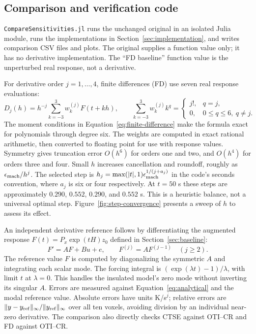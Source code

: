 \documentclass[10pt]{article}
\begin{document}
\subsection{Comparison and verification code}
\label{sec:verification}
\texttt{CompareSensitivities.jl} runs the unchanged original in an isolated Julia
module, runs the implementations in Section~\ref{sec:implementation}, and writes comparison CSV files and plots.
The original supplies a function value only; it has no derivative implementation.
The ``FD baseline'' function value is the unperturbed real response, not a derivative.

For derivative order $j=1,\ldots,4$, finite differences (FD) use seven real
response evaluations:
\begin{equation}
\label{eq:finite-difference}
 D_j(h)=h^{-j}\sum_{k=-3}^{3}w_k^{(j)}F(t+kh),\qquad
 \sum_{k=-3}^{3}w_k^{(j)}k^q=
 \begin{cases}j!,&q=j,\\0,&0\leq q\leq6,\ q\ne j.\end{cases}
\end{equation}
The moment conditions in Equation~\eqref{eq:finite-difference} make the formula exact for polynomials through degree six.
The weights are computed in exact rational arithmetic, then converted to floating
point for use with response values. Symmetry gives truncation error $O(h^6)$
for orders one and two, and $O(h^4)$ for orders three and four.
Small $h$ increases cancellation and roundoff, roughly as
$\epsilon_{\rm mach}/h^j$. The selected step is
$h_j=\max(|t|,1)\epsilon_{\rm mach}^{1/(j+a_j)}$ in the code's seconds convention,
where $a_j$ is six or four respectively. At $t=50$ s these steps are approximately
$0.290$, $0.552$, $0.290$, and $0.552$ s. This is a heuristic balance, not a
universal optimal step. Figure~\ref{fig:step-convergence} presents a sweep of $h$ to assess its effect.

An independent derivative reference follows by differentiating the augmented
response $F(t)=P_x\exp(tH)z_0$ defined in Section~\ref{sec:baseline}:
\begin{equation}
\label{eq:analytical}
 F'=AF+Bu+e,\qquad F^{(j)}=AF^{(j-1)}\quad(j\geq2).
\end{equation}
The reference value $F$ is computed by diagonalizing the symmetric $A$ and
integrating each scalar mode. The forcing integral is
$(\exp(\lambda t)-1)/\lambda$, with limit $t$ at $\lambda=0$.
This handles the insulated model's zero mode without inverting its singular $A$.
Errors are measured against Equation~\eqref{eq:analytical} and the modal reference
value. Absolute errors have units K/s$^j$; relative errors are
$\|y-y_{\rm ref}\|_\infty/\|y_{\rm ref}\|_\infty$ over all ten voxels, avoiding
division by an individual near-zero derivative. The comparison also directly
checks CTSE against OTI--CR and FD against OTI--CR.
\end{document}
